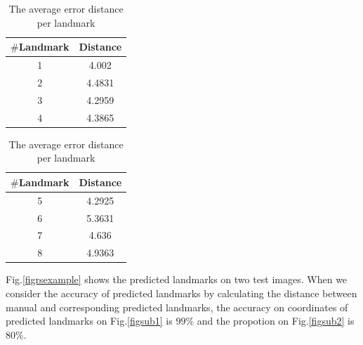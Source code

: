 \documentclass[10pt]{article}
\begin{document}
\begin{table}[h!]
	\begin{subtable}{.22\linewidth}
	\centering
	\begin{tabular}{|c|c| }
	\hline
	\textbf{$\#$Landmark} & \textbf{Distance} \\ \hline
	1 & 4.002  \\ \hline
	2 & 4.4831 \\ \hline
	3 & 4.2959 \\ \hline
	4 & 4.3865 \\ \hline
	
	\end{tabular}
	\end{subtable}%
	\hspace{2.5cm}
	\begin{subtable}{.2\linewidth}
	\centering
	\begin{tabular}{|c|c| }
	\hline
	\textbf{$\#$Landmark} & \textbf{Distance} \\ \hline
	5 & 4.2925 \\ \hline
	6 & 5.3631 \\ \hline
	7 & 4.636 \\ \hline
	8 & 4.9363 \\ \hline
	\end{tabular}
	\end{subtable}
	\caption{The average error distance per landmark}
	\label{tabledistance}
\end{table}

Fig.\ref{figrsexample} shows the predicted landmarks on two test
images. When we consider the accuracy of predicted landmarks by
calculating the distance between manual and corresponding predicted
landmarks, the accuracy on coordinates of predicted landmarks on
Fig.\ref{figsub1} is $99\%$ and the propotion on Fig.\ref{figsub2} is
$80\%$.
\end{document}
